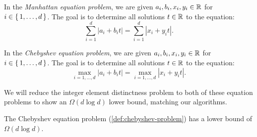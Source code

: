 \begin{definition}\label{def:manhattan-problem}
	In the \emph{Manhattan equation problem}, we are given \(a_i, b_i, x_i, y_i \in \mathbb{R}\) for \(i \in \set{1, \dots, d}\). The goal is to determine all solutions \(t \in \mathbb{R}\) to the equation:
	\[\sum_{i=1}^d |a_i + b_i t| = \sum_{i=1}^d |x_i + y_i t|.\]
\end{definition}

\begin{definition}\label{def:chebyshev-problem}
	In the \emph{Chebyshev equation problem}, we are given \(a_i, b_i, x_i, y_i \in \mathbb{R}\) for \(i \in \set{1, \dots, d}\). The goal is to determine all solutions \(t \in \mathbb{R}\) to the equation:
	\[\max_{i=1, \dots, d} |a_i + b_i t| = \max_{i=1,\dots, d} |x_i + y_i t|.\]
\end{definition}

We will reduce the integer element distinctness problem to both of these equation problems to show an \(\Omega(d \log d)\) lower bound, matching our algorithms.

\begin{lemma}
	The Chebyshev equation problem (\cref{def:chebyshev-problem}) has a lower bound of \(\Omega(d \log d)\).
\end{lemma}

